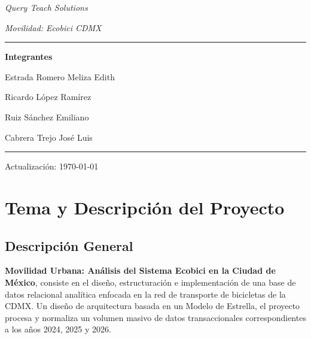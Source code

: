 \documentclass[10pt,a4paper]{article}
\begin{document}
\begin{titlepage}
    \vspace{0.3cm}
    {\large\textit{Query Teach Solutions}}

    \vspace{0.2cm}
    {\large\textit{Movilidad: Ecobici CDMX}}

    \vspace{6cm}

    \rule{\linewidth}{0.5mm}

    \vspace{0.3cm}
    {\large\textbf{Integrantes}}

    \vspace{0.3cm}
    {\large Estrada Romero Meliza Edith}

    \vspace{0.15cm}
    {\large Ricardo López Ramírez}

    \vspace{0.15cm}
    {\large Ruiz Sánchez Emiliano}

    \vspace{0.15cm}
    {\large Cabrera Trejo José Luis}

    \vspace{0.5cm}
    \rule{\linewidth}{0.5mm}

    \vspace{0.5cm}

    {\small Actualización: \today}

\end{titlepage}



\tableofcontents

\clearpage

\setcounter{page}{1}

\section{Tema y Descripción del Proyecto}

\subsection{Descripción General}
\textbf{Movilidad Urbana: Análisis del Sistema Ecobici en la Ciudad de México}, 
consiste en el diseño, estructuración e implementación de una base de datos relacional 
analítica enfocada en la red de transporte de bicicletas de la CDMX. Un diseño de arquitectura basada en 
un Modelo de Estrella, el proyecto procesa y normaliza un volumen masivo de datos transaccionales 
correspondientes a los años 2024, 2025 y 2026. 
\end{document}
